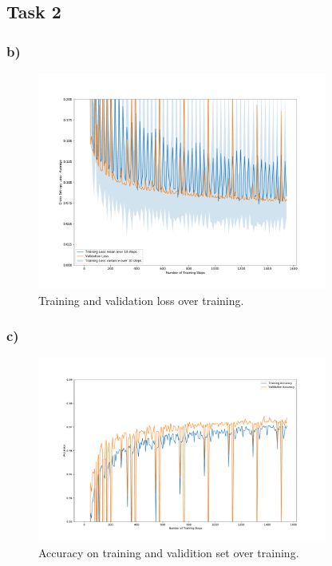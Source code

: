 \newpage
\subsection*{Task 2}

\subsubsection*{b)}

\begin{figure}[h!]
    \centering
    \includegraphics[clip, trim=0cm 0cm 0cm 0cm,width=0.85\textwidth]{figures/Task2b.pdf}
    \caption{Training and validation loss over training.}
    \label{fig:task2:train_val_loss}
\end{figure}

\subsubsection*{c)}

\begin{figure}[h!]
    \centering
    \includegraphics[clip, trim=0cm 0cm 0cm 0cm,width=0.85\textwidth]{figures/Task2c.pdf}
    \caption{Accuracy on training and validition set over training.}
    \label{fig:task2:accuracy}
\end{figure}


